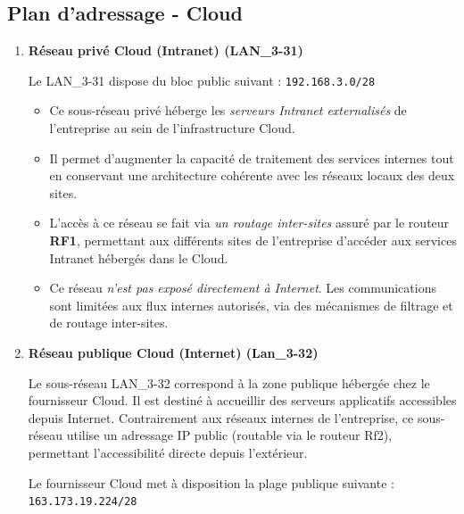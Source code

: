 \documentclass[12pt,a4paper, oneside]{memoir}
\begin{document}
\subsection{Plan d'adressage - Cloud}
\begin{enumerate}
	\item \textbf{Réseau privé Cloud (Intranet) (LAN\_3-31)}

	Le LAN\_3-31 dispose du bloc public suivant :	\texttt{192.168.3.0/28}

	\begin{itemize}[label*=*]
		\item  Ce sous-réseau privé héberge les \textit{serveurs Intranet externalisés} de l’entreprise au sein de l’infrastructure Cloud.  
		
		\item  Il permet d’augmenter la capacité de traitement des services internes tout en conservant une architecture cohérente avec les réseaux locaux des deux sites.
		
		\item  L’accès à ce réseau se fait via \textit{un routage inter-sites} assuré par le routeur \textbf{RF1}, permettant aux différents sites de l’entreprise d’accéder aux services Intranet hébergés dans le Cloud.
		
		\item  Ce réseau \textit{n’est pas exposé directement à Internet}. Les communications sont limitées aux flux internes autorisés, via des mécanismes de filtrage et de routage inter-sites.
	\end{itemize}
	

	
	\item \textbf{Réseau publique Cloud (Internet) (Lan\_3-32)}
	
	Le sous-réseau LAN\_3-32 correspond à la zone publique hébergée chez le fournisseur Cloud.
	Il est destiné à accueillir des serveurs applicatifs accessibles depuis Internet. Contrairement aux réseaux internes de l’entreprise, ce sous-réseau utilise un adressage IP public (routable via le routeur Rf2), permettant l’accessibilité directe depuis l’extérieur.

	\vspace{0.5cm}

	Le fournisseur Cloud met à disposition la plage publique suivante : \texttt{163.173.19.224/28}


\end{enumerate}
\end{document}
